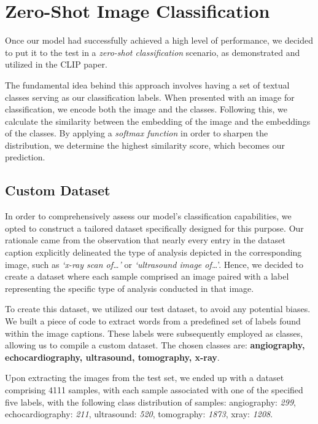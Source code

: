 \documentclass[10pt,twocolumn,letterpaper]{article}
\begin{document}
\section{Zero-Shot Image Classification}

Once our model had successfully achieved a high level of performance, we decided to put it to the test in a \textit{zero-shot classification} scenario, as demonstrated and utilized in the CLIP paper.

The fundamental idea behind this approach involves having a set of textual classes serving as our classification labels. When presented with an image for classification, we encode both the image and the classes. Following this, we calculate the similarity between the embedding of the image and the embeddings of the classes. By applying a \textit{softmax function} in order to sharpen the distribution, we determine the highest similarity score, which becomes our prediction.

\subsection{Custom Dataset}
In order to comprehensively assess our model's classification capabilities, we opted to construct a tailored dataset specifically designed for this purpose. Our rationale came from the observation that nearly every entry in the dataset caption explicitly delineated the type of analysis depicted in the corresponding image, such as \textit{`x-ray scan of\ldots'} or \textit{ `ultrasound image of\ldots}'. Hence, we decided to create a dataset where each sample comprised an image paired with a label representing the specific type of analysis conducted in that image.

To create this dataset, we utilized our test dataset, to avoid any potential biases. We built a piece of code to extract words from a predefined set of labels found within the image captions. These labels were subsequently employed as classes, allowing us to compile a custom dataset. The chosen classes are: \textbf{angiography, echocardiography, ultrasound, tomography, x-ray}.

Upon extracting the images from the test set, we ended up with a dataset comprising 4111 samples, with each sample associated with one of the specified five labels, with the following class distribution of samples: angiography: \textit{299}, echocardiography: \textit{211}, ultrasound: \textit{520}, tomography: \textit{1873}, xray: \textit{1208}.
\end{document}
